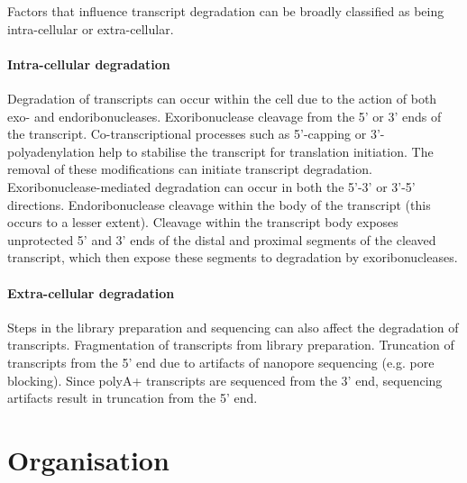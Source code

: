 Factors that influence transcript degradation can be broadly classified as being intra-cellular or extra-cellular. 

\paragraph{Intra-cellular degradation} Degradation of transcripts can occur within the cell due to the action of both exo- and endoribonucleases. Exoribonuclease cleavage from the 5’ or 3’ ends of the transcript. Co-transcriptional processes such as 5’-capping or 3’-polyadenylation help to stabilise the transcript for translation initiation. The removal of these modifications can initiate transcript degradation. Exoribonuclease-mediated degradation can occur in both the 5’-3’ or 3’-5’ directions. Endoribonuclease cleavage within the body of the transcript (this occurs to a lesser extent). Cleavage within the transcript body exposes unprotected 5’ and 3’ ends of the distal and proximal segments of the cleaved transcript, which then expose these segments to degradation by exoribonucleases. 

\paragraph{Extra-cellular degradation} Steps in the library preparation and sequencing can also affect the degradation of transcripts. Fragmentation of transcripts from library preparation. Truncation of transcripts from the 5’ end due to artifacts of nanopore sequencing (e.g. pore blocking). Since polyA+ transcripts are sequenced from the 3’ end, sequencing artifacts result in truncation from the 5’ end.


\section{Organisation}

